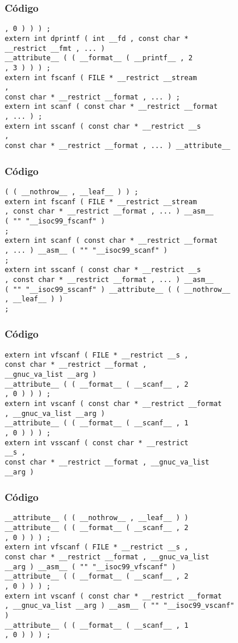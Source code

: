 \documentclass{beamer}
\begin{document}
\begin{frame}[fragile]
\frametitle{C\'odigo}
\begin{verbatim}
, 0 ) ) ) ; 
extern int dprintf ( int __fd , const char * 
__restrict __fmt , ... ) 
__attribute__ ( ( __format__ ( __printf__ , 2 
, 3 ) ) ) ; 
extern int fscanf ( FILE * __restrict __stream 
, 
const char * __restrict __format , ... ) ; 
extern int scanf ( const char * __restrict __format 
, ... ) ; 
extern int sscanf ( const char * __restrict __s 
, 
const char * __restrict __format , ... ) __attribute__ 
\end{verbatim}
\end{frame}
\begin{frame}[fragile]
\frametitle{C\'odigo}
\begin{verbatim}
( ( __nothrow__ , __leaf__ ) ) ; 
extern int fscanf ( FILE * __restrict __stream 
, const char * __restrict __format , ... ) __asm__ 
( "" "__isoc99_fscanf" ) 
; 
extern int scanf ( const char * __restrict __format 
, ... ) __asm__ ( "" "__isoc99_scanf" ) 
; 
extern int sscanf ( const char * __restrict __s 
, const char * __restrict __format , ... ) __asm__ 
( "" "__isoc99_sscanf" ) __attribute__ ( ( __nothrow__ 
, __leaf__ ) ) 
; 
\end{verbatim}
\end{frame}
\begin{frame}[fragile]
\frametitle{C\'odigo}
\begin{verbatim}
extern int vfscanf ( FILE * __restrict __s , 
const char * __restrict __format , 
__gnuc_va_list __arg ) 
__attribute__ ( ( __format__ ( __scanf__ , 2 
, 0 ) ) ) ; 
extern int vscanf ( const char * __restrict __format 
, __gnuc_va_list __arg ) 
__attribute__ ( ( __format__ ( __scanf__ , 1 
, 0 ) ) ) ; 
extern int vsscanf ( const char * __restrict 
__s , 
const char * __restrict __format , __gnuc_va_list 
__arg ) 
\end{verbatim}
\end{frame}
\begin{frame}[fragile]
\frametitle{C\'odigo}
\begin{verbatim}
__attribute__ ( ( __nothrow__ , __leaf__ ) ) 
__attribute__ ( ( __format__ ( __scanf__ , 2 
, 0 ) ) ) ; 
extern int vfscanf ( FILE * __restrict __s , 
const char * __restrict __format , __gnuc_va_list 
__arg ) __asm__ ( "" "__isoc99_vfscanf" ) 
__attribute__ ( ( __format__ ( __scanf__ , 2 
, 0 ) ) ) ; 
extern int vscanf ( const char * __restrict __format 
, __gnuc_va_list __arg ) __asm__ ( "" "__isoc99_vscanf" 
) 
__attribute__ ( ( __format__ ( __scanf__ , 1 
, 0 ) ) ) ; 
\end{verbatim}
\end{frame}
\end{document}
